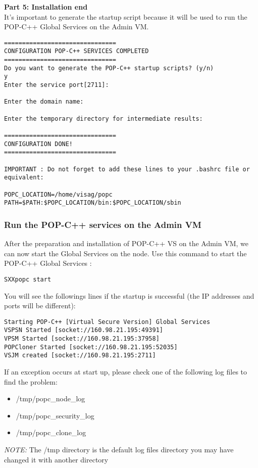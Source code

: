 \pagebreak
\textbf{Part 5: Installation end}\\
It's important to generate the startup script because it will be used to run the POP-C++ Global Services on the Admin VM.
\begin{lstlisting}
===============================
CONFIGURATION POP-C++ SERVICES COMPLETED
===============================
Do you want to generate the POP-C++ startup scripts? (y/n)
y
Enter the service port[2711]:

Enter the domain name:

Enter the temporary directory for intermediate results:

===============================
CONFIGURATION DONE!
===============================

IMPORTANT : Do not forget to add these lines to your .bashrc file or 
equivalent:

POPC_LOCATION=/home/visag/popc
PATH=$PATH:$POPC_LOCATION/bin:$POPC_LOCATION/sbin
\end{lstlisting}\s




\subsubsection{Run the POP-C++ services on the Admin VM}
After the preparation and installation of POP-C++ VS on the Admin VM, we can now start the Global Services on the node. Use this command to start the POP-C++ Global Services : 
\begin{lstlisting}
SXXpopc start
\end{lstlisting}\s

You will see the followings lines if the startup is successful (the IP addresses and ports will be different):\s
\begin{lstlisting}
Starting POP-C++ [Virtual Secure Version] Global Services
VSPSN Started [socket://160.98.21.195:49391]
VPSM Started [socket://160.98.21.195:37958]
POPCloner Started [socket://160.98.21.195:52035]
VSJM created [socket://160.98.21.195:2711]
\end{lstlisting}\s

If an exception occurs at start up, please check one of the following log files to find the problem: 

\begin{itemize}
\item /tmp/popc\_node\_log
\item /tmp/popc\_security\_log
\item /tmp/popc\_clone\_log
\end{itemize}

\textit{NOTE:} The /tmp directory is the default log files directory you may have changed it with another directory
 